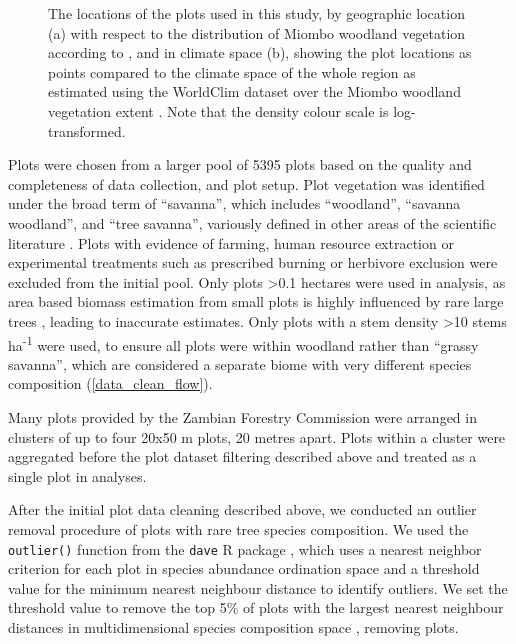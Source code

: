 \documentclass[11pt,a4paper]{article}
\begin{document}
\begin{figure}[H]
	\centering
    \qquad
{}%
\caption{The locations of the \nplots{} plots used in this study, by geographic location (a) with respect to the distribution of Miombo woodland vegetation according to \citet{White1987}, and in climate space (b), showing the plot locations as points compared to the climate space of the whole region as estimated using the WorldClim dataset over the Miombo woodland vegetation extent \citep{Fick2017}. Note that the density colour scale is log-transformed.}
\end{figure}

Plots were chosen from a larger pool of 5395 plots based on the quality and completeness of data collection, and plot setup. Plot vegetation was identified under the broad term of ``savanna'', which includes ``woodland'', ``savanna woodland'', and ``tree savanna'', variously defined in other areas of the scientific literature \citep{Ratnam2011, Hill2010}. Plots with evidence of farming, human resource extraction or experimental treatments such as prescribed burning or herbivore exclusion were excluded from the initial pool. Only plots >0.1 hectares were used in analysis, as area based biomass estimation from small plots is highly influenced by rare large trees \citep{Stegen2011}, leading to inaccurate estimates. Only plots with a stem density >10 stems ha\textsuperscript{-1} were used, to ensure all plots were within woodland rather than ``grassy savanna'', which are considered a separate biome with very different species composition \citep{Parr2014} (\autoref{data_clean_flow}).

Many plots provided by the Zambian Forestry Commission were arranged in clusters of up to four 20x50 m plots, 20 metres apart. Plots within a cluster were aggregated before the plot dataset filtering described above and treated as a single plot in analyses.

After the initial plot data cleaning described above, we conducted an outlier removal procedure of plots with rare tree species composition. We used the \verb|outlier()| function from the \verb|dave| R package \citep{dave}, which uses a nearest neighbor criterion for each plot in species abundance ordination space and a threshold value for the minimum nearest neighbour distance to identify outliers. We set the threshold value to remove the top 5\% of plots with the largest nearest neighbour distances in multidimensional species composition space \citep{Otto2013}, removing \noutliers{} plots.
\end{document}
